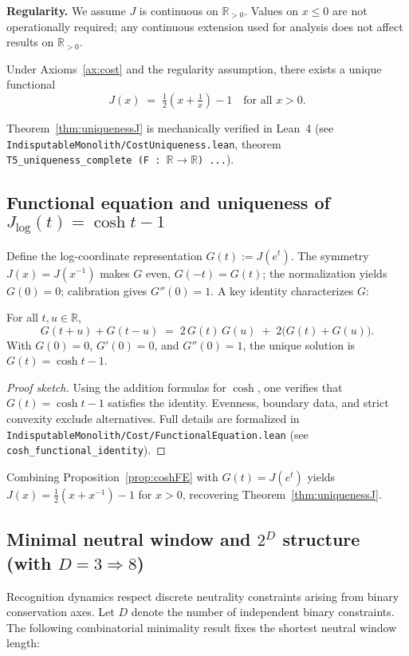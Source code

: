 \documentclass[12pt,a4paper]{article}
\begin{document}
\noindent\textbf{Regularity.} We assume $J$ is continuous on $\mathbb{R}_{>0}$. Values on $x\le 0$ are not operationally required; any continuous extension used for analysis does not affect results on $\mathbb{R}_{>0}$.

\begin{theorem}\label{thm:uniquenessJ}
Under Axioms~\ref{ax:cost} and the regularity assumption, there exists a unique functional
\[
  J(x)\;=\;\tfrac{1}{2}\!\left(x+\tfrac{1}{x}\right)-1
\quad\text{for all }x>0.
\]
\end{theorem}

\begin{remark}
Theorem~\ref{thm:uniquenessJ} is mechanically verified in Lean~4 (see \texttt{IndisputableMonolith/CostUniqueness.lean}, theorem \texttt{T5\_uniqueness\_complete (F : $\mathbb{R}\to\mathbb{R}$)~...}).
\end{remark}

\subsection{Functional equation and uniqueness of $J_{\log}(t)=\cosh t-1$}
Define the log-coordinate representation $G(t):=J(e^{t})$. The symmetry $J(x)=J(x^{-1})$ makes $G$ even, $G(-t)=G(t)$; the normalization yields $G(0)=0$; calibration gives $G''(0)=1$. A key identity characterizes $G$:

\begin{proposition}\label{prop:coshFE}
For all $t,u\in\mathbb{R}$,
\[
  G(t+u)+G(t-u)\;=\;2\,G(t)\,G(u)\;+\;2\big(G(t)+G(u)\big).
\]
With $G(0)=0$, $G'(0)=0$, and $G''(0)=1$, the unique solution is $G(t)=\cosh t-1$.
\end{proposition}

\begin{proof}[Proof sketch]
Using the addition formulas for $\cosh$, one verifies that $G(t)=\cosh t-1$ satisfies the identity. Evenness, boundary data, and strict convexity exclude alternatives. Full details are formalized in \texttt{IndisputableMonolith/Cost/FunctionalEquation.lean} (see \texttt{cosh\_functional\_identity}).
\end{proof}

Combining Proposition~\ref{prop:coshFE} with $G(t)=J(e^{t})$ yields $J(x)=\tfrac{1}{2}(x+x^{-1})-1$ for $x>0$, recovering Theorem~\ref{thm:uniquenessJ}.

\subsection{Minimal neutral window and $2^{D}$ structure (with $D=3\Rightarrow 8$)}
Recognition dynamics respect discrete neutrality constraints arising from binary conservation axes. Let $D$ denote the number of independent binary constraints. The following combinatorial minimality result fixes the shortest neutral window length:
\end{document}
